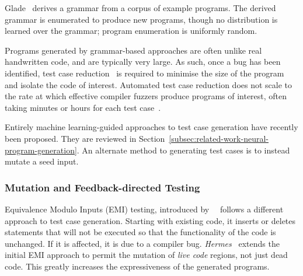 Glade~\cite{Bastani2017} derives a grammar from a corpus of example programs. The derived grammar is enumerated to produce new programs, though no distribution is learned over the grammar; program enumeration is uniformly random.

Programs generated by grammar-based approaches are often unlike real handwritten code, and are typically very large. As such, once a bug has been identified, test case reduction~\cite{Regehr2012a} is required to minimise the size of the program and isolate the code of interest. Automated test case reduction does not scale to the rate at which effective compiler fuzzers produce programs of interest, often taking minutes or hours for each test case~\cite{Pflanzer2016}.

Entirely machine learning-guided approaches to test case generation have recently been proposed. They are reviewed in Section~\ref{subsec:related-work-neural-program-generation}. An alternate method to generating test cases is to instead mutate a seed input.


\subsubsection{Mutation and Feedback-directed Testing}

Equivalence Modulo Inputs (EMI) testing, introduced by~\citeauthor{Le2013a}~\cite{Le2013a} follows a different approach to test case generation. Starting with existing code, it inserts or deletes statements that will not be executed so that the functionality of the code is unchanged. If it is affected, it is due to a compiler bug. \emph{Hermes}~\cite{Sun2016a} extends the initial EMI approach to permit the mutation of \emph{live code} regions, not just dead code. This greatly increases the expressiveness of the generated programs.

